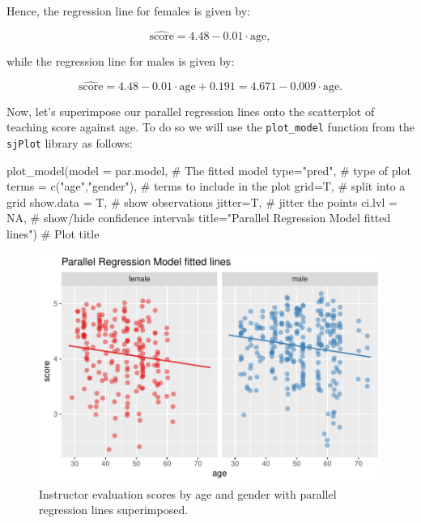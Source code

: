 \documentclass[
  letterpaper,
  DIV=11,
  numbers=noendperiod]{scrartcl}
\newenvironment{Shaded}{\begin{snugshade}}{\end{snugshade}}
\newcommand{\AttributeTok}[1]{\textcolor[rgb]{0.40,0.45,0.13}{#1}}
\newcommand{\CommentTok}[1]{\textcolor[rgb]{0.37,0.37,0.37}{#1}}
\newcommand{\ConstantTok}[1]{\textcolor[rgb]{0.56,0.35,0.01}{#1}}
\newcommand{\FunctionTok}[1]{\textcolor[rgb]{0.28,0.35,0.67}{#1}}
\newcommand{\NormalTok}[1]{\textcolor[rgb]{0.00,0.23,0.31}{#1}}
\newcommand{\StringTok}[1]{\textcolor[rgb]{0.13,0.47,0.30}{#1}}
\begin{document}
Hence, the regression line for females is given by:

\[\widehat{\text{score}} = 4.48 - 0.01 \cdot \text{age},\]

while the regression line for males is given by:

\[\widehat{\text{score}} = 4.48 - 0.01 \cdot \text{age} + 0.191 = 4.671 - 0.009 \cdot \text{age}.\]

Now, let's superimpose our parallel regression lines onto the
scatterplot of teaching score against age. To do so we will use the
\texttt{plot\_model} function from the \texttt{sjPlot} library as
follows:

\begin{Shaded}
\begin{Highlighting}[]
\FunctionTok{plot\_model}\NormalTok{(}\AttributeTok{model =}\NormalTok{ par.model,                 }\CommentTok{\# The fitted model}
           \AttributeTok{type=}\StringTok{"pred"}\NormalTok{,               }\CommentTok{\# type of plot}
           \AttributeTok{terms =} \FunctionTok{c}\NormalTok{(}\StringTok{"age"}\NormalTok{,}\StringTok{"gender"}\NormalTok{), }\CommentTok{\# terms to include in the plot}
           \AttributeTok{grid=}\NormalTok{T,                    }\CommentTok{\# split into a grid}
           \AttributeTok{show.data =}\NormalTok{ T,             }\CommentTok{\# show observations}
           \AttributeTok{jitter=}\NormalTok{T,                  }\CommentTok{\# jitter the points}
           \AttributeTok{ci.lvl =} \ConstantTok{NA}\NormalTok{,               }\CommentTok{\# show/hide confidence intervals}
           \AttributeTok{title=}\StringTok{"Parallel Regression Model fitted lines"}\NormalTok{) }\CommentTok{\# Plot title}
\end{Highlighting}
\end{Shaded}

\begin{figure}[H]

{\centering \includegraphics{notes_files/figure-pdf/unnamed-chunk-7-1.pdf}

}

\caption{Instructor evaluation scores by age and gender with parallel
regression lines superimposed.}

\end{figure}%
\end{document}
